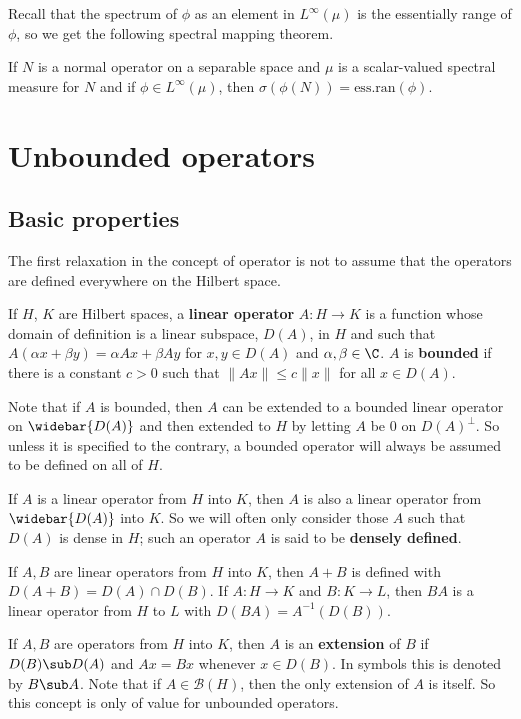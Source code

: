 Recall that the spectrum of $\phi$ as an element in $L^\infty(\mu)$ is the essentially range of $\phi$, so we get the following spectral mapping theorem.
\begin{theorem}
If $N$ is a normal operator on a separable space and $\mu$ is a scalar-valued spectral measure for $N$ and if $\phi\in L^\infty(\mu)$, then $\sigma(\phi(N))=\mathrm{ess.ran}(\phi)$.
\end{theorem}
\section{Unbounded operators}
\subsection{Basic properties}
The first relaxation in the concept of operator is not to assume that the operators are defined everywhere on the Hilbert space.
\begin{definition}
If $H$, $K$ are Hilbert spaces, a \textbf{linear operator} $A:H\to K$ is a function whose domain of definition is a linear subspace, $D(A)$, in $H$ and such that $A(\alpha x+\beta y)=\alpha Ax+\beta Ay$ for $x,y\in D(A)$ and $\alpha,\beta\in\C$. $A$ is \textbf{bounded} if there is a constant $c>0$ such that $\|Ax\|\leq c\|x\|$ for all $x\in D(A)$.
\end{definition}
Note that if $A$ is bounded, then $A$ can be extended to a bounded linear operator on $\widebar{D(A)}$ and then extended to $H$ by letting $A$ be $0$ on $D(A)^\bot$. So unless it is specified to the contrary, a bounded operator will always be assumed to be defined on all of $H$.\par
If $A$ is a linear operator from $H$ into $K$, then $A$ is also a linear operator from $\widebar{D(A)}$ into $K$. So we will often only consider those $A$ such that $D(A)$ is dense in $H$; such an operator $A$ is said to be \textbf{densely defined}.\par
If $A,B$ are linear operators from $H$ into $K$, then $A+B$ is defined with $D(A+B)=D(A)\cap D(B)$. If $A:H\to K$ and $B:K\to L$, then $BA$ is a linear operator from $H$ to $L$ with $D(BA)=A^{-1}(D(B))$.
\begin{definition}
If $A,B$ are operators from $H$ into $K$, then $A$ is an \textbf{extension} of $B$ if $D(B)\sub D(A)$ and $Ax=Bx$ whenever $x\in D(B)$. In symbols this is denoted by $B\sub A$. Note that if $A\in\mathcal{B}(H)$, then the only extension of $A$ is itself. So this concept is only of value for unbounded operators.
\end{definition}
